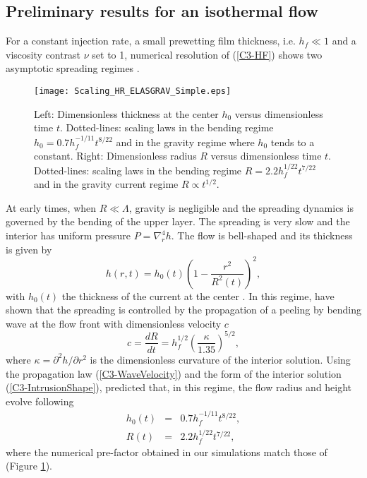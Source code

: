 \subsection{Preliminary results for an isothermal flow}
\label{C3-sec:prel-results-isoth}

For a constant injection rate, a small prewetting film thickness, i.e.
$h_f\ll1$  and  a  viscosity  contrast   $\nu$  set  to  1,  numerical
resolution  of (\ref{C3-HF})  shows two  asymptotic spreading  regimes
\citep{Michaut:2011kg,Lister:2013ia}.
\begin{figure}[h!]
  \begin{center}
    \graphicspath{ {/Users/thorey/Documents/These/Projet/Refroidissement/Skin_Model/Figure/JFM_V13/} }
    \texttt{[image: Scaling\_HR\_ELASGRAV\_Simple.eps]}
    \caption{Left: Dimensionless thickness at  the center $h_0$ versus
      dimensionless  time  $t$.   Dotted-lines: scaling  laws  in  the
      bending regime $h_0= 0.7h_f^{-1/11}t^{8/22}$  and in the gravity
      regime where  $h_0$ tends  to a constant.   Right: Dimensionless
      radius $R$ versus dimensionless time $t$.  Dotted-lines: scaling
      laws in the bending regime $R= 2.2h_f^{1/22}t^{7/22}$ and in the
      gravity current regime $R\propto t^{1/2}$.}
    \label{C3-Scaling_HR_ELASGRAV_Simple}
  \end{center}
\end{figure}

At  early times,  when $R\ll\Lambda$,  gravity is  negligible and  the
spreading dynamics is governed by the bending of the upper layer.  The
spreading  is  very  slow  and   the  interior  has  uniform  pressure
$P =\nabla_r^4h$.  The flow is  bell-shaped and its thickness is given
by
\begin{equation}
  h(r,t) = h_0(t)\left(1-\frac{r^2}{R^2(t)}\right)^2,
  \label{C3-IntrusionShape}
\end{equation}
with   $h_0(t)$  the   thickness  of   the  current   at  the   center
\citep{Michaut:2011kg,Lister:2013ia}.       In       this      regime,
\citet{Lister:2013ia} have  shown that the spreading  is controlled by
the propagation  of a peeling by  bending wave at the  flow front with
dimensionless velocity $c$
\begin{equation}
  c=    \frac{d             R}{d            t}             =h_f^{1/2}
  \left(\frac{\kappa}{1.35}\right)^{5/2},
  \label{C3-WaveVelocity}
\end{equation}
where  $\kappa  =  \partial^2  h/\partial r^2$  is  the  dimensionless
curvature  of  the  interior  solution.   Using  the  propagation  law
(\ref{C3-WaveVelocity})  and   the  form  of  the   interior  solution
(\ref{C3-IntrusionShape}),  \citet{Lister:2013ia}  predicted that,  in
this regime, the flow radius and height evolve following
\begin{eqnarray}
  h_0(t)&=& 0.7 h_f^{-1/11}t^{8/22}\label{C3-ScalingH},\\
  R(t) &=& 2.2h_f^{1/22}t^{7/22}\label{C3-ScalingR},
\end{eqnarray}
where the numerical pre-factor obtained in our simulations match those
of \citet{Lister:2013ia} (Figure \ref{C3-Scaling_HR_ELASGRAV_Simple}).

